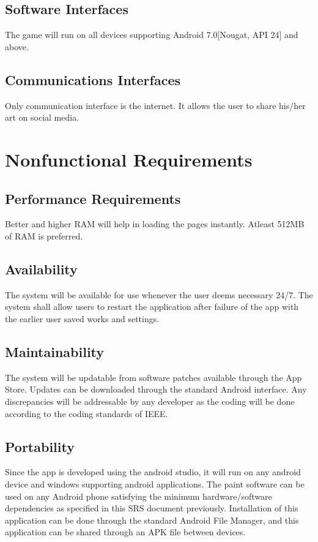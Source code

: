 \documentclass{scrreprt}
\begin{document}
\section{Software Interfaces}
The game will run on all devices supporting Android 7.0[Nougat, API 24] and above.

\section{Communications Interfaces}
Only communication interface is the internet. It allows the user to share his/her art on social media.

\chapter{Nonfunctional Requirements}

\section{Performance Requirements}
Better and higher RAM will help in loading the pages instantly. Atleast 512MB of RAM is preferred.

\section{Availability}
The system will be available for use whenever the user deems necessary 24/7. The system shall allow users to restart the application after failure of the app with the earlier user saved works and settings.

\section{Maintainability}
The system will be updatable from software patches available through the App Store. Updates can be downloaded through the standard Android interface. Any discrepancies will be addressable by any developer as the coding will be done according to the coding standards of IEEE.

\section{Portability}
Since the app is developed using the android studio, it will run on any android device and windows supporting android applications.
The paint software can be used on any Android phone satisfying the minimum hardware/software dependencies as specified in this SRS document previously. Installation of this application can be done through the standard Android File Manager, and this application can be shared through an APK file between devices.
\end{document}
